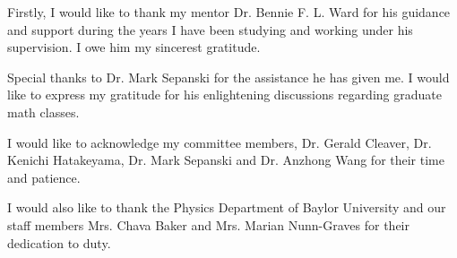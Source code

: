 Firstly, I would like to thank my mentor Dr. Bennie F. L. Ward for his guidance and support during the years I have been studying and working under his supervision. I owe him my sincerest gratitude. 

Special thanks to Dr. Mark Sepanski for the assistance he has given me. I would like to express my gratitude for his enlightening discussions regarding graduate math classes.

I would like to acknowledge my committee members, Dr. Gerald Cleaver, Dr. Kenichi Hatakeyama, Dr. Mark Sepanski and Dr. Anzhong Wang for their time and patience.

I would also like to thank the Physics Department of Baylor University and our staff members Mrs. Chava Baker and Mrs. Marian Nunn-Graves for their dedication to duty. 
